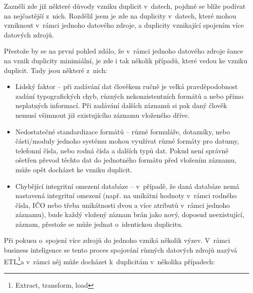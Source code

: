Zazněli zde již některé důvody vzniku duplicit v~datech, pojdmě se blíže podívat na nejčastější z~nich. Rozdělil jsem je zde na duplicity v~datech, které mohou vzniknout v~rámci jednoho datového zdroje, a duplicity vznikající spojením více datových zdrojů.

Přestože by se na první pohled zdálo, že v~rámci jednoho datového zdroje šance na vznik duplicity minimiální, je zde i tak několik případů, které vedou ke vzniku duplicit. Tady jsou některé z~nich:

\begin{itemize}
  \item Lidský faktor – při zadávání dat člověkem ručně je velká pravděpodobnost zadání typografických chyb, různých nekonzistentních formátů a nebo přímo neplatných informací. Při zadávání dalších záznamů si pak daný člověk nemusí všimnout již existujícího záznamu vloženého dříve.
  \item Nedostatečné standardizace formátů – různé formuláře, dotazníky, nebo části/moduly jednoho systému mohou využívat různé formáty pro datumy, telefonní čísla, nebo rodná čísla a dalších typů dat. Pokud není správně ošetřen převod těchto dat do jednotného formátu před vložením záznamu, může opět docházet ke vzniku duplicit.
  \item Chybějící integritní omezení databáze – v~případě, že daná databáze nemá nastavená integritní omezení (např. na unikátní hodnoty v~rámci rodného čísla, IČO nebo třeba unikátnosti dvou a více atributů v~rámci jednoho záznamu), bude každý vložený záznam brán jako nový, doposud neexistující, záznam, přestože se může jednat o~identickou duplicitu.
\end{itemize}

Při pokusu o~spojení více zdrojů do jednoho vzniká několik výzev. V~rámci business inteligence se tento proces spojování různých datových zdrojů nazývá ETL\footnote{Extract, transform, load
}a v~rámci něj může docházet k~duplicitám v~několika případech:

